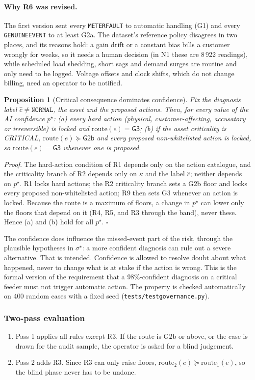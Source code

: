 \documentclass[11pt,a4paper]{article}
\newtheorem{proposition}{Proposition}
\renewcommand{\_}{\textunderscore\allowbreak}
\providecommand{\GE}{\texttt{GENUINE\_EVENT}}
\providecommand{\MF}{\texttt{METER\_FAULT}}
\providecommand{\NORM}{\texttt{NORMAL}}
\newcommand{\lvl}[1]{\textsf{#1}}
\begin{document}
\paragraph{Why R6 was revised.} The first version sent every \MF{} to automatic handling (\lvl{G1}) and every
\GE{} to at least \lvl{G2a}. The dataset's reference policy disagrees in two places, and its reasons hold:
a gain drift or a constant bias bills a customer wrongly for weeks, so it needs a human decision (in N1 these
are 8\,922 readings), while scheduled load shedding, short sags and demand surges are routine and only need to
be logged. Voltage offsets and clock shifts, which do not change billing, need an operator to be notified.

\begin{proposition}[Critical consequence dominates confidence]
Fix the diagnosis label $\hat c\ne\NORM$, the asset and the proposed actions. Then, for every value of the AI
confidence $p^\star$: (a) every hard action (physical, customer-affecting, accusatory or irreversible) is locked
and $\mathrm{route}(e)=\lvl{G3}$; (b) if the asset criticality is CRITICAL, $\mathrm{route}(e)\succeq\lvl{G2b}$ and
every proposed non-whitelisted action is locked, so $\mathrm{route}(e)=\lvl{G3}$ whenever one is proposed.
\end{proposition}
\noindent\textit{Proof.} The hard-action condition of R1 depends only on the action catalogue, and the
criticality branch of R2 depends only on $\kappa$ and the label $\hat c$; neither depends on $p^\star$. R1 locks
hard actions; the R2 criticality branch sets a \lvl{G2b} floor and locks every proposed non-whitelisted action;
R9 then sets \lvl{G3} whenever an action is locked. Because the route is a maximum of floors, a change in
$p^\star$ can lower only the floors that depend on it (R4, R5, and R3 through the band), never these. Hence (a)
and (b) hold for all $p^\star$. $\square$

The confidence does influence the missed-event part of the risk, through the plausible hypotheses in
$\sigma^\star$: a more confident diagnosis can rule out a severe alternative. That is intended. Confidence is
allowed to resolve doubt about what happened, never to change what is at stake if the action is wrong. This is
the formal version of the requirement that a 98\%-confident diagnosis on a critical feeder must not trigger
automatic action. The property is checked automatically on 400 random cases with a fixed seed
(\texttt{tests/test\_governance.py}).

\subsubsection{Two-pass evaluation}
\begin{enumerate}[leftmargin=*,itemsep=1pt]
\item Pass 1 applies all rules except R3. If the route is \lvl{G2b} or above, or the case is drawn for the
audit sample, the operator is asked for a blind judgement.
\item Pass 2 adds R3. Since R3 can only raise floors, $\mathrm{route}_2(e)\succeq\mathrm{route}_1(e)$, so the
blind phase never has to be undone.
\end{enumerate}
\end{document}
